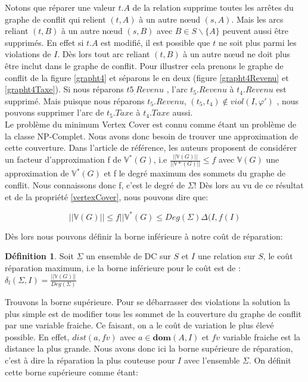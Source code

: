\documentclass[letterpaper, 12pt]{report}
\theoremstyle{definition}
\newtheorem{mydef}{Définition}
\newcommand{\dom}{\mathbf{dom}}
\newcommand{\V}{\mathbb{V}}
\begin{document}
Notons que réparer une valeur $t.A$ de la relation supprime toutes les arrêtes du graphe de conflit qui relient $(t,A)$ à un autre nœud $(s,A)$. Mais les arcs reliant $(t,B)$ à un autre nœud $(s,B)$ avec $B \in S\backslash\{A\}$ peuvent aussi être supprimés. En effet si $t.A$ est modifié, il est possible que $t$ ne soit plus parmi les violations de $I$. Dès lors tout arc reliant $(t,B)$ à un autre nœud ne doit plus être inclut dans le graphe de conflit. Pour illustrer cela prenons le graphe de conflit de la figure  \ref{grapht4} et séparons le en deux (figure \ref{grapht4Revenu} et \ref{grapht4Taxe}). Si nous réparons $t5_.Revenu$ , l'arc $t_5.Revenu$ à $t_4.Revenu$ est supprimé. Mais puisque nous réparons $t_5.Revenu$, $(t_5,t_4) \not\in viol(I,\varphi')$ , nous pouvons supprimer l'arc de $t_5.Taxe$ à $t_4.Taxe$ aussi.\\

Le problème du minimum Vertex Cover est connu comme étant un problème de la classe NP-Complet. Nous avons donc besoin de trouver une approximation de cette couverture. Dans l'article de référence\cite{main}, les auteurs proposent de considérer un facteur d'approximation f de $\V^*(G)$, i.e $\frac{||\V(G)||}{||\V*(G)||} \leq f$ avec $\V(G)$ une approximation de $\V^*(G)$ et f le degré maximum des sommets du graphe de conflit. Nous connaissons donc f, c'est le degré de $\Sigma$! Dès lors au vu de ce résultat et de la propriété \ref{vertexCover}, nous pouvons dire que:

$$ ||\V(G)|| \leq f||\V^*(G) \leq Deg(\Sigma)\Delta(I,f(I)$$

Dès lors nous pouvons définir la borne inférieure à notre coût de réparation:

\begin{mydef}
\label{defBorneInf}
Soit $\Sigma$ un ensemble de DC sur $S$ et $I$ une relation sur $S$, le coût réparation maximum, i.e la borne inférieure pour le coût est de :
$\delta_l(\Sigma,I) = \frac{||\V(G)||}{Deg(\Sigma)} $
\end{mydef}

Trouvons la borne supérieure. Pour se débarrasser des violations la solution la plus simple est de modifier tous les sommet de la couverture du graphe de conflit par une variable fraiche. Ce faisant, on a le coût de variation le plus élevé possible. En effet, $dist(a,fv)$ avec $a \in \dom(A,I)$ et $fv$ variable fraiche est la distance la plus grande. Nous avons donc ici la borne supérieure de réparation, c'est à dire la réparation la plus couteuse pour $I$ avec l'ensemble $\Sigma$. On définit cette borne supérieure comme étant:
\end{document}
